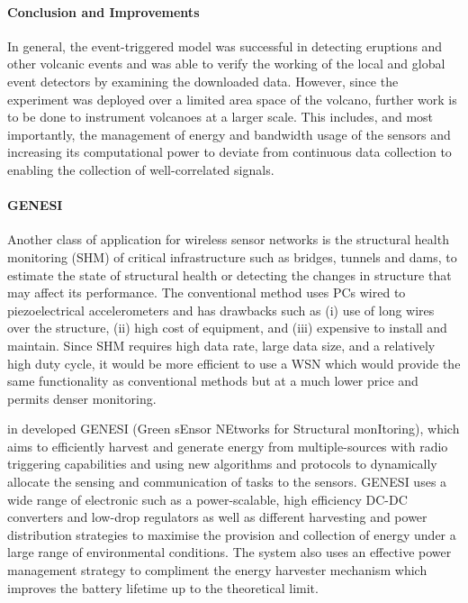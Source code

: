 \paragraph{Conclusion and Improvements}

In general, the event-triggered model was successful in detecting eruptions and other volcanic events and was able to verify the working of the local and global event detectors by examining the downloaded data. However, since the experiment was deployed over a limited area space of the volcano, further work is to be done to instrument volcanoes at a larger scale. This includes, and most importantly, the management of energy and bandwidth usage of the sensors and increasing its computational power to deviate from continuous data collection to enabling the collection of well-correlated signals. 

\paragraph{GENESI} Another class of application for wireless sensor networks is the structural health monitoring (SHM) of critical infrastructure such as bridges, tunnels and dams, to estimate the state of structural health or detecting the changes in structure that may affect its performance. The conventional method uses PCs wired to piezoelectrical accelerometers and has drawbacks such as (i) use of long wires over the structure, (ii) high cost of equipment, and (iii) expensive to install and maintain. Since SHM requires high data rate, large data size, and a relatively high duty cycle, it would be more efficient to use a WSN which would provide the same functionality as conventional methods but at a much lower price and permits denser monitoring.

\citeauthor{5508230} in \cite{5508230} developed GENESI (Green sEnsor NEtworks for Structural monItoring), which aims to efficiently harvest and generate energy from multiple-sources with radio triggering capabilities and using new algorithms and protocols to dynamically allocate the sensing and communication of tasks to the sensors. GENESI uses a wide range of electronic such as a power-scalable, high efficiency  DC-DC converters and low-drop regulators as well as different harvesting and power distribution strategies to maximise the provision and collection of energy under a large range of environmental conditions. The system also uses an effective power management strategy to compliment the energy harvester mechanism which improves the battery lifetime up to the theoretical limit.


